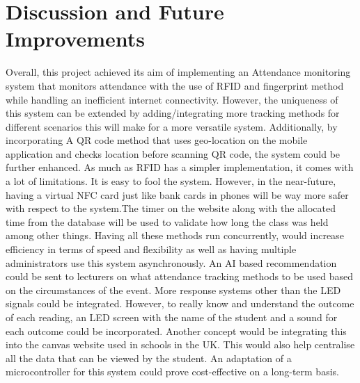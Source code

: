 \section{Discussion and Future Improvements}
Overall, this project achieved its aim of implementing an Attendance monitoring system that monitors attendance with the use of RFID and fingerprint method while handling an inefficient internet connectivity. However, the uniqueness of this system can be extended by adding/integrating more tracking methods for different scenarios this will make for a more versatile system. Additionally, by incorporating A QR code method that uses geo-location on the mobile application and checks location before scanning QR code, the system could be further enhanced.  As much as RFID has a simpler implementation, it comes with a lot of limitations. It is easy to fool the system. However, in the near-future,  having a virtual NFC card just like bank cards in phones will be way more safer with respect to the system.The timer on the website along with the allocated time from the database will be used to validate how long the class was held among other things. Having all these methods run concurrently, would increase efficiency in terms of speed and flexibility as well as 
having multiple administrators use this system asynchronously. An AI based recommendation could be sent to lecturers on what attendance tracking methods to be used based on the circumstances of the event. More response systems other than the LED signals could be integrated. However, to really know and understand the outcome of each reading, an LED screen with the name of the student and a sound for each outcome could be incorporated. Another concept would be integrating this into the canvas website used in schools in the UK. This would also help centralise all the data that can be viewed by the student. An adaptation of a microcontroller for this system could prove cost-effective on a long-term basis.

 
 
 

